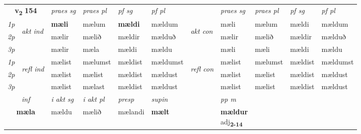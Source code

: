 \noindent
\begin{tabular}{lllllllllll} \toprule
\multicolumn{2}{c}{\textbf{v{\textsubscript{2}}} \Large{\textbf{154}}}  &  \textit{praes sg}  & \textit{praes pl}  &\textit{ pf sg} & \textit{pf pl} &  &  \textit{praes sg}  & \textit{praes pl}  & \textit{pf sg} & \textit{pf pl } \\*
	\cmidrule{3-6} \cmidrule{8-11}
 {\textit{1p}} & \multirow{3}{*}{\begin{turn}{90}\textit{akt ind}\end{turn}} & \textbf{mæli} & mælum & \textbf{mældi} & mældum & \multirow{3}{*}{\begin{turn}{90}\textit{akt con}\end{turn}} &mæli & mælum & mældi & mældum\\*
 {\textit{2p}} &  &  mælir  & mælið & mældir & mælduð & & mælir & mælið & mældir & mælduð \\*
{\textit{3p}} &  & mælir & mæla & mældi & mældu & & mæli & mæli& mældi & mældu \\*
\cmidrule{3-6} \cmidrule{8-11}
 {\textit{1p}} & \multirow{3}{*}{\begin{turn}{90}\textit{refl ind}\end{turn}}  & mælist & mælumst & mældist & mældumst & \multirow{3}{*}{\begin{turn}{90}\textit{refl con}\end{turn}}  &mælist & mælumst & mældist & mældumst \\*
 {\textit{2p}} &  & mælist & mælist & mældist & mældust & &mælist & mælist & mældist & mældust \\*
 {\textit{3p}}  & & mælist & mælast & mældist & mældust & & mælist & mælist& mældist & mældust \\*
\cmidrule{3-6} \cmidrule{8-11}

   \multicolumn{2}{c}{\textit{inf}}  & \textit{i akt sg} & \textit{i akt pl}   & \textit{presp} & \textit{supin}  && \textit{pp m} \\*
  \multicolumn{2}{c}{\textbf{mæla}} & mældu  & mælið   & mælandi &  \textbf{mælt}  && \specialcell{\textbf{mældur} \\ adj\textbf{\textsubscript{2-14}}} \\*
\end{tabular}

